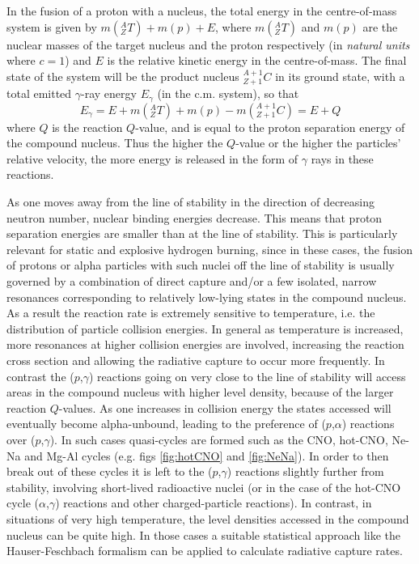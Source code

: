 In the fusion of a proton with a nucleus, the total energy in the centre-of-mass system is given by $m(^{A}_{Z}T)+m(p)+E$, where $m(^{A}_{Z}T)$ and $m(p)$ are the nuclear masses of the target nucleus and the proton respectively (in {\em natural units} where $c=1$) and $E$ is the relative kinetic energy in the centre-of-mass. The final state of the system will be the product nucleus $^{A+1}_{Z+1}C$ in its ground state, with a total emitted $\gamma$-ray energy $E_{\gamma}$ (in the c.m. system), so that
\begin{equation}
E_{\gamma}=E+m(^{A}_{Z}T)+m(p)-m(^{A+1}_{Z+1}C)=E+Q
\end{equation}
where $Q$ is the reaction $Q$-value, and is equal to the proton separation energy of the compound nucleus. Thus the higher the $Q$-value or the higher the particles' relative velocity, the more energy is released in the form of $\gamma$ rays in these reactions. 
 
As one moves away from the line of stability in the direction of decreasing neutron number, nuclear binding energies decrease. This means that proton separation energies are smaller than at the line of stability. This is particularly relevant for static and explosive hydrogen burning, since in these cases, the fusion of protons or alpha particles with such nuclei off the line of stability is usually governed by a combination of direct capture and/or a few isolated, narrow resonances corresponding to relatively low-lying states in the compound nucleus. As a result the reaction rate is extremely sensitive to temperature, i.e. the distribution of particle collision energies. In general as temperature is increased, more resonances at higher collision energies are involved, increasing the reaction cross section and allowing the radiative capture to occur more frequently. In contrast the ($p$,$\gamma$) reactions going on very close to the line of stability will access areas in the compound nucleus with higher level density, because of the larger reaction $Q$-values. As one increases in collision energy the states accessed will eventually become alpha-unbound, leading to the preference of ($p$,$\alpha$) reactions over ($p$,$\gamma$). In such cases quasi-cycles are formed such as the CNO, hot-CNO, Ne-Na and Mg-Al cycles (e.g. figs \ref{fig:hotCNO} and \ref{fig:NeNa}). In order to then break out of these cycles it is left to the ($p$,$\gamma$) reactions slightly further from stability, involving short-lived radioactive nuclei (or in the case of the hot-CNO cycle ($\alpha$,$\gamma$) reactions and other charged-particle reactions). In contrast, in situations of very high temperature, the level densities accessed in the compound nucleus can be quite high. In those cases a suitable statistical approach like the Hauser-Feschbach \cite{Hau52} formalism can be applied to calculate radiative capture rates.  


